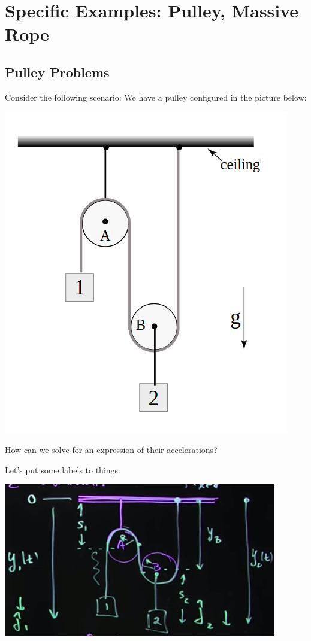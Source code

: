 \documentclass{report}
\begin{document}
\section{Specific Examples: Pulley, Massive Rope}
\subsection{Pulley Problems}
Consider the following scenario:
We have a pulley configured in the picture below:


\includegraphics[scale=0.5]{pulley.png}

How can we solve for an expression of their accelerations?

Let's put some labels to things:

\includegraphics[scale=0.5]{pulley_labels.png}
\end{document}
